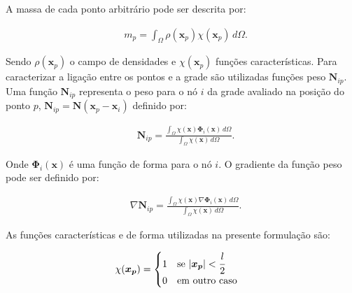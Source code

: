 A massa de cada ponto arbitrário pode ser descrita por:

\begin{align}
  &m_p =\int_{\Omega}\rho(\boldsymbol{x}_p)\chi(\boldsymbol{x}_p)\,d\Omega.
\end{align}

Sendo $\rho(\boldsymbol{x}_p)$ o campo de densidades e $\chi(\boldsymbol{x}_p)$ funções características. Para caracterizar a ligação entre os pontos e a grade são utilizadas funções peso $\boldsymbol{N}_{ip}$. Uma função $\boldsymbol{N}_{ip}$ representa o peso para o nó $i$ da grade avaliado na posição do ponto $p$, $\boldsymbol{N}_{ip} = \boldsymbol{N}(\boldsymbol{x}_p-\boldsymbol{x}_i)$ definido por:

\begin{align}
  &\boldsymbol{N}_{ip} = \frac{\displaystyle\int_{\Omega}\chi(\boldsymbol{x})\boldsymbol{\Phi}_i(\boldsymbol{x})\,d\Omega}{\displaystyle\int_{\Omega}\chi(\boldsymbol{x})\,d\Omega}.
\end{align}

Onde $\boldsymbol{\Phi}_i(\boldsymbol{x})$ é uma função de forma para o nó $i$. O gradiente da função peso pode ser definido por:

\begin{align}
  &\nabla\boldsymbol{N}_{ip} = \frac{\displaystyle\int_{\Omega}\chi(\boldsymbol{x})\nabla\boldsymbol{\Phi}_i(\boldsymbol{x})\,d\Omega}{\displaystyle\int_{\Omega}\chi(\boldsymbol{x})\,d\Omega}.
\end{align}

As funções características e de forma utilizadas na presente formulação são:

\begin{align}
  &\chi(\boldsymbol{x_p}) = 
    \begin{cases}
      1 &\text{se } |\boldsymbol{x_p}| < \cfrac{l}{2}\\
      0 &\text{em outro caso}
    \end{cases}\label{eq-vol-carac-1}
\end{align}

\makeatletter
{}
\makeatother

